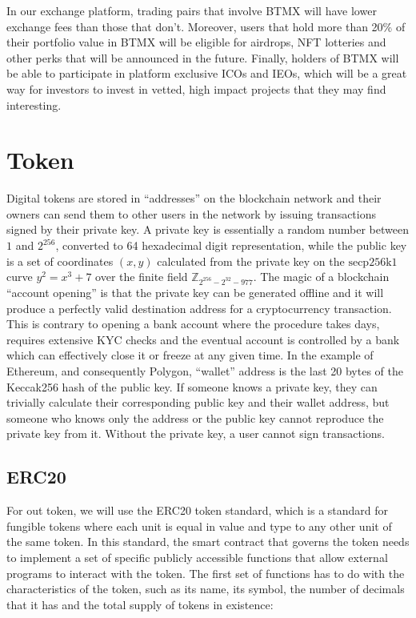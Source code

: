 \documentclass[a4paper,12pt]{article}
\begin{document}
In our exchange platform, trading pairs that involve BTMX will have lower exchange fees
than those that don't.
Moreover, users that hold more than 20\% of their portfolio value in BTMX
will be eligible for airdrops, NFT lotteries and other perks that will be announced in the future.
Finally, holders of BTMX will be able to participate in platform exclusive ICOs and IEOs,
which will be a great way for investors to invest in vetted, high impact projects that
they may find interesting.


\section{Token}

Digital tokens are stored in ``addresses'' on the blockchain network and
their owners can send them to other users in the network by issuing transactions signed by
their private key.
A private key is essentially a random number between $1$ and $2^{256}$,
converted to 64 hexadecimal digit representation,
while the public key is a set of coordinates $(x,y)$ calculated from the private key on the
$\text{secp}256\text{k}1$ curve $y^2 = x^3 + 7$ over the finite field
$\mathbb{Z}_{2^{256}-2^{32}-977}$.
The magic of a blockchain ``account opening'' is that the private key can be generated offline and
it will produce a perfectly valid destination address for a cryptocurrency transaction.
This is contrary to opening a bank account where the procedure takes days, requires
extensive KYC checks and the eventual account is controlled by a bank which can
effectively close it or freeze at any given time.
In the example of Ethereum, and consequently Polygon,
``wallet'' address is the last 20 bytes of the Keccak256 hash of the public key.
If someone knows a private key, they can trivially calculate their corresponding public key
and their wallet address, but someone who knows only the address or the public key cannot
reproduce the private key from it. Without the private key, a user cannot sign transactions.

\subsection{ERC20}
For out token, we will use the ERC20 token standard, which is a standard for fungible
tokens where each unit is equal in value and type to any other unit of the same token.
In this standard, the smart contract that governs the
token needs to implement a set of specific publicly accessible functions that
allow external programs to interact with the token.
The first set of functions has to do with the characteristics of the token, such as its name, its symbol, the number of decimals that it has and the total supply of tokens in existence:
\end{document}
